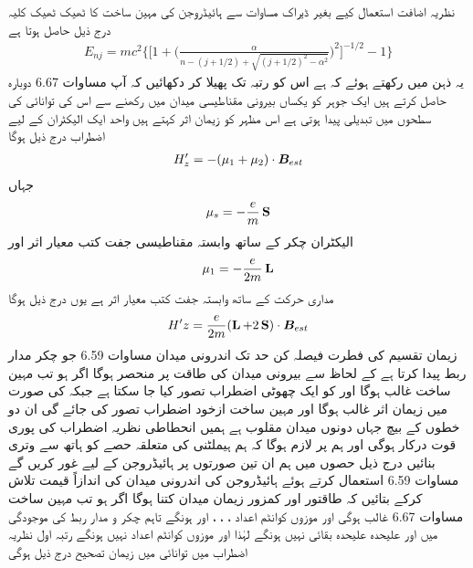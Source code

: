 نظریہ اضافت استعمال کیے بغیر ڈیراک مساوات سے ہائیڈروجن کی مہین ساخت کا ٹھیک ٹھیک کلیہ درج ذیل حاصل ہوتا ہے 
\begin{align*}
E_{nj} = mc^2 \big \{ \big [ 1 + \big ( \frac{\alpha}{n - (j + 1/2 ) + \sqrt{(j +1/2)^2 - \alpha^2}} \big )^2 \big ]^{- 1/2} -1 \big \}
\end{align*}
یہ ذہن میں رکھتے ہوئے کہ  ہے اس کو  رتبہ تک پھیلا کر دکھائیں کہ آپ مساوات 6.67 دوبارہ حاصل کرتے ہیں 
ایک جوہر کو یکساں بیرونی مقناطیسی میدان  میں رکھنے سے اس کی توانائی کی سطحوں  میں تبدیلی پیدا ہوتی ہے اس مظہر کو زیمان اثر کہتے ہیں واحد ایک الیکٹران کے لیے اضطراب درج ذیل ہوگا 
\begin{align} 
H'_z = - (\mu_1 + \mu_2) \cdot {\ensuremath{{\boldsymbol{B}}}}_{est}
\end{align}
جہاں 
\begin{align}
\mu_s = - \frac{e}{m} \operatorname{\mathbf{S}}
\end{align}
الیکٹران چکر کے ساتھ وابستہ مقناطیسی جفت کتب معیار اثر اور 
\begin{align} 
\mu_1 = - \frac{e}{2m} \operatorname{\mathbf{L}}
\end{align}
مداری حرکت کے ساتھ وابستہ جفت کتب معیار اثر ہے یوں  درج ذیل ہوگا 
\begin{align}
H'z = \frac{e}{2m} (\operatorname{\mathbf{L}} + 2 \operatorname{\mathbf{S}}) \cdot {\ensuremath{{\boldsymbol{B}}}}_{est}
\end{align}
زیمان تقسیم کی فطرت فیصلہ کن حد تک اندرونی میدان مساوات 6.59 جو چکر مدار ربط پیدا کرتا ہے کے لحاظ سے بیرونی میدان کی طاقت پر منحصر ہوگا اگر   ہو تب مہین ساخت غالب ہوگا اور  کو ایک چھوٹی اضطراب تصور کیا جا سکتا ہے جبکہ  کی صورت میں زیمان  اثر غالب ہوگا اور مہین ساخت ازخود اضطراب تصور کی جائے گی ان دو خطوں کے بیچ جہاں دونوں میدان  مقلوب  ہے ہمیں انحطاطی نظریہ اضطراب کی پوری قوت درکار ہوگی اور ہم پر  لازم ہوگا کہ ہم ہیملٹنی کی متعلقہ حصے کو ہاتھ سے وتری بنائیں درج ذیل حصوں میں ہم ان تین صورتوں پر ہائیڈروجن کے لیے غور کریں گے 
مساوات 6.59 استعمال کرتے ہوئے ہائیڈروجن کی اندرونی میدان کی اندازاً  قیمت تلاش کرکے بتائیں  کہ  طاقتور اور کمزور زیمان میدان کتنا ہوگا 
اگر  ہو تب مہین ساخت مساوات 6.67 غالب ہوگی اور موزوں کوانٹم اعداد ، ، ، اور  ہونگے تاہم چکر و مدار ربط کی موجودگی میں  اور  علیحدہ علیحدہ بقائی نہیں ہونگے لہٰذا  اور  موزوں کوانٹم اعداد نہیں ہونگے رتبہ اول نظریہ اضطراب میں توانائی میں زیمان تصحیح درج ذیل ہوگی 
